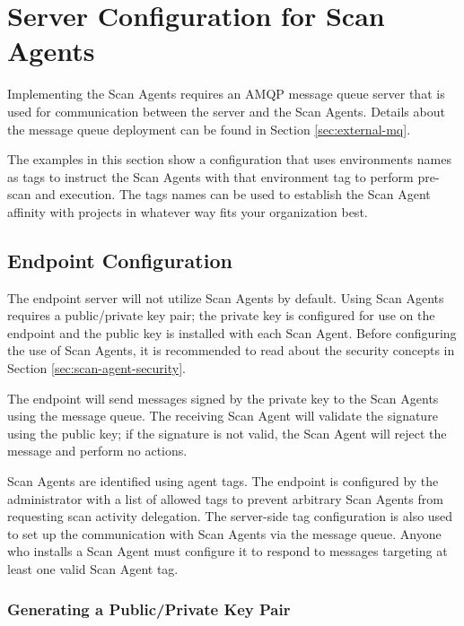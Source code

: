 \section{Server Configuration for Scan Agents}\label{sec:scan-agent-server}

Implementing the Scan Agents requires an AMQP message queue server that
is used for communication between the \cxoneflow server and the Scan
Agents.  Details about the message queue deployment can be found in Section \ref{sec:external-mq}.

The examples in this section show a configuration that uses environments names as tags to
instruct the Scan Agents with that environment tag to perform pre-scan and \scaresolver
execution.  The tags names can be used to establish the Scan Agent affinity with \cxone projects
in whatever way fits your organization best.

\subsection{\cxoneflowtext\space Endpoint Configuration}

The \cxoneflow endpoint server  will not utilize Scan Agents
by default.  Using Scan Agents requires a public/private key pair; the private key is configured
for use on the \cxoneflow endpoint and the public key is installed with each Scan Agent.  Before
configuring the use of Scan Agents, it is recommended to read about the security
concepts in Section \ref{sec:scan-agent-security}.

The \cxoneflow endpoint will send messages signed by the private key to the Scan
Agents using the message queue.  The receiving Scan Agent will validate the signature
using the public key; if the signature is not valid, the Scan Agent will reject the message
and perform no actions.

Scan Agents are identified using agent tags.  The \cxoneflow endpoint is configured by the
administrator with a list of allowed tags to prevent arbitrary Scan Agents from requesting
scan activity delegation.  The server-side tag configuration is also used to set up the communication
with Scan Agents via the message queue.  Anyone who installs a Scan Agent must configure it to respond to messages
targeting at least one valid Scan Agent tag.


\subsubsection{Generating a Public/Private Key Pair}\label{ref:server-key-pair}

